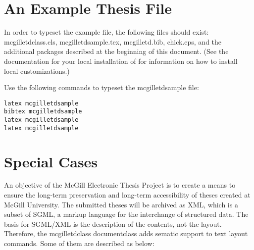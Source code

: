 \documentclass[12pt,Bold,letterpaper,TexShade]{mcgilletdclass}
\begin{document}
\section{An Example Thesis File}
In order to typeset the example file, the following files should exist:
mcgilletdclass.cls, mcgilletdsample.tex, mcgilletd.bib, chick.eps, and the additional
packages described at the beginning of this document.  (See the documentation
for your local installation of \LaTeXe for information on how to install
local customizations.)

Use the following commands to typeset the mcgilletdsample file:

\begin{verbatim}
latex mcgilletdsample
bibtex mcgilletdsample
latex mcgilletdsample
latex mcgilletdsample
\end{verbatim}

\section{Special Cases}
An objective of the McGill Electronic Thesis Project is to create a means to 
ensure the long-term preservation and long-term accessibility of theses created 
at McGill University. The submitted theses will be archived as XML, which is a 
subset of SGML, a markup language for the interchange of structured data.  
The basis for SGML/XML is the description of the contents, not the layout.  Therefore,
the mcgilletdclass documentclass adds sematic support to text layout commands. Some of them
are described as below:
\end{document}
